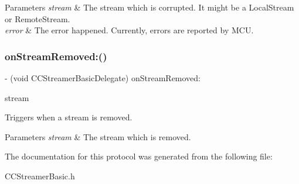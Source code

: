 \begin{DoxyParams}{Parameters}
{\em stream} & The stream which is corrupted. It might be a Local\+Stream or Remote\+Stream. \\
\hline
{\em error} & The error happened. Currently, errors are reported by M\+CU. \\
\hline
\end{DoxyParams}
\mbox{\label{protocol_c_c_streamer_basic_delegate_01-p_a8524700b14302c2592755b042b3fd5a7}} 
\subsubsection{\texorpdfstring{on\+Stream\+Removed\+:()}{onStreamRemoved:()}}
{\footnotesize\ttfamily -\/ (void C\+C\+Streamer\+Basic\+Delegate) on\+Stream\+Removed\+: \begin{DoxyParamCaption}\item[{(\hyperlink{interface_c_c_stream}{C\+C\+Stream} $\ast$)}]{stream }\end{DoxyParamCaption}\hspace{0.3cm}{\ttfamily [optional]}}



Triggers when a stream is removed. 


\begin{DoxyParams}{Parameters}
{\em stream} & The stream which is removed. \\
\hline
\end{DoxyParams}


The documentation for this protocol was generated from the following file\+:\begin{DoxyCompactItemize}
\item 
C\+C\+Streamer\+Basic.\+h\end{DoxyCompactItemize}
